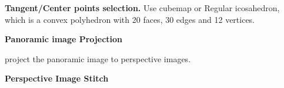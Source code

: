 

\textbf{Tangent/Center points selection.}
Use cubemap or Regular icosahedron, which is a convex polyhedron with 20 faces, 30 edges and 12 vertices.

%


\textbf{Panoramic image Projection}

project the panoramic image to perspective images.


\textbf{Perspective Image Stitch}


